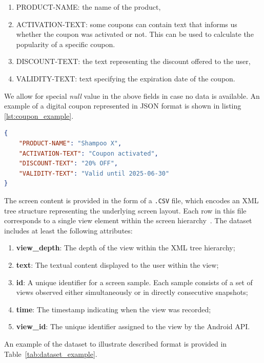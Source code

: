 \documentclass[licencjacka,en]{pracamgr}
\begin{document}
\begin{enumerate}
    \item PRODUCT-NAME: the name of the product,
       \item ACTIVATION-TEXT: some coupons can contain text that informs us whether the coupon was activated or not.
        This can be used to calculate the popularity of a specific coupon.
    \item DISCOUNT-TEXT: the text representing the discount offered to the user,
    \item VALIDITY-TEXT: text specifying the expiration date of the coupon.
\end{enumerate}
We allow for special \textit{null} value in the above fields in case no data is available. An example of a digital coupon represented in JSON format is shown in listing \ref{lst:coupon_example}.

\begin{lstlisting}[language=json, caption={Example of a digital coupon in JSON format}, label={lst:coupon_example}]
{
    "PRODUCT-NAME": "Shampoo X",
    "ACTIVATION-TEXT": "Coupon activated",
    "DISCOUNT-TEXT": "20% OFF",
    "VALIDITY-TEXT": "Valid until 2025-06-30"
}
\end{lstlisting}

The screen content is provided in the form of a \texttt{.CSV} file, which encodes an XML tree structure representing the underlying screen layout. Each row in this file corresponds to a single view element within the screen hierarchy~\cite{android_view}. The dataset includes at least the following attributes:

\begin{enumerate}
    \item \textbf{view\_depth}: The depth of the view within the XML tree hierarchy;
    \item \textbf{text}: The textual content displayed to the user within the view;
    \item \textbf{id}: A unique identifier for a screen sample. Each sample consists of a set of views observed either simultaneously or in directly consecutive snapshots;
    \item \textbf{time}: The timestamp indicating when the view was recorded;
    \item \textbf{view\_id}: The unique identifier assigned to the view by the Android API.
\end{enumerate}

An example of the dataset to illustrate described format is provided in Table~\ref{tab:dataset_example}.
\end{document}
